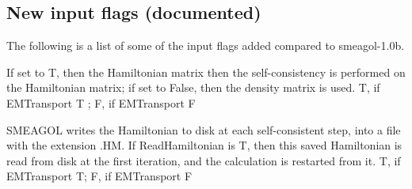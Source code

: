 \documentclass[11pt]{article}
\begin{document}
{%
%
%
%
%
%
%
%
%
%
%
%
%
%
%
%
%
%
%
%
%
%
%
%

\subsection{New input flags (documented)}
The following is a list of some of the input flags added compared to smeagol-1.0b.\\
\vspace{0.3cm}

{If set to T, then the Hamiltonian matrix then the self-consistency is performed on the Hamiltonian matrix; if set to False, then the density matrix is used.}
{T, if EMTransport T ; F, if EMTransport F}

{SMEAGOL writes the Hamiltonian to disk at each self-consistent step, into a file with the extension .HM. If ReadHamiltonian is T, then this saved Hamiltonian is read from disk at the first iteration, and the calculation is restarted from it.}
{T, if EMTransport T; F, if EMTransport F}

}
\end{document}
